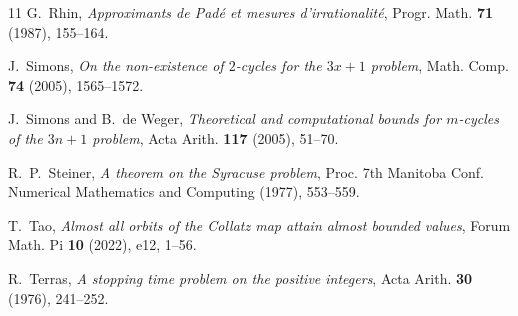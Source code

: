 \documentclass[11pt, a4paper]{amsart}
\theoremstyle{definition}
\begin{document}
\begin{thebibliography}{11}
G.~Rhin, \emph{Approximants de Pad\'{e} et mesures d'irrationalit\'{e}}, Progr. Math. \textbf{71} (1987), 155--164.

J.~Simons, \emph{On the non-existence of $2$-cycles for the $3x+1$ problem}, Math. Comp. \textbf{74} (2005), 1565--1572.

J.~Simons and B.~de Weger, \emph{Theoretical and computational bounds for $m$-cycles of the $3n+1$ problem}, Acta Arith. \textbf{117} (2005), 51--70.

R.~P.~Steiner, \emph{A theorem on the Syracuse problem}, Proc. 7th Manitoba Conf. Numerical Mathematics and Computing (1977), 553--559.

T.~Tao, \emph{Almost all orbits of the Collatz map attain almost bounded values}, Forum Math. Pi \textbf{10} (2022), e12, 1--56.

R.~Terras, \emph{A stopping time problem on the positive integers}, Acta Arith. \textbf{30} (1976), 241--252.

\end{thebibliography}
\end{document}
